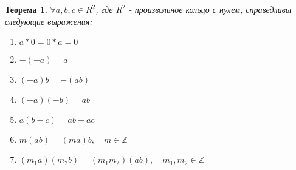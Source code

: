 \documentclass[12pt,oneside]{article}
\newtheorem{theorem}{Теорема}[section]
\theoremstyle{definition}
\newcommand{\ZZ}{\mathbb{Z}}
\begin{document}
\begin{theorem}
	$\forall a,b,c \in R^2$, где $R^2$ - произвольное кольцо с нулем, справедливы следующие выражения:
	\begin{enumerate}
		\item\label{e_a} $a*0=0*a=0$
		\item\label{e_b} $-(-a)=a$
		\item\label{e_c} $(-a)b=-(ab)$
		\item\label{e_d} $(-a)(-b)=ab$
		\item\label{e_e} $a(b-c)=ab-ac$
		\item\label{e_f} $m(ab)=(ma)b, \quad m \in \ZZ$
		\item\label{e_g} $(m_1a)(m_2b)=(m_1m_2)(ab), \quad m_1,m_2 \in \ZZ$
	\end{enumerate}
\end{theorem}
\end{document}
